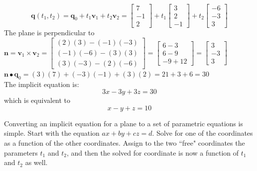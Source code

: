 \documentclass{article}
\begin{document}
\begin{itemize}
\[\mathbf{q}(t_1, t_2) = \mathbf{q}_0 + t_1\mathbf{v}_1 + t_2\mathbf{v}_2 = \begin{bmatrix} 7 \\ -1 \\ 2 \end{bmatrix} + t_1\begin{bmatrix} 3 \\ 2 \\ -1 \end{bmatrix} + t_2\begin{bmatrix} -6 \\ -3 \\ 3 \end{bmatrix}\]
The plane is perpendicular to \(\mathbf{n} = \mathbf{v}_1 \times \mathbf{v}_2 = \begin{bmatrix} (2)(3) - (-1)(-3) \\ (-1)(-6) - (3)(3) \\ (3)(-3) - (2)(-6) \end{bmatrix} = \begin{bmatrix} 6 - 3 \\ 6 - 9 \\ -9 + 12 \end{bmatrix} = \begin{bmatrix} 3 \\ -3 \\ 3 \end{bmatrix}\) \\
\(\mathbf{n} \bullet \mathbf{q}_0 = (3)(7) + (-3)(-1) + (3)(2) = 21 + 3 + 6 = 30\) \\
The implicit equation is:
\[3x - 3y + 3z = 30\]
which is equivalent to 
\[x - y + z = 10\]
\end{itemize}

\vspace{5mm}

Converting an implicit equation for a plane to a set of parametric equations is simple. Start with the equation \(a x + b y + c z = d\). Solve for one of the coordinates as a function of the other coordinates. Assign to the two ``free" coordinates the parameters \(t_1\) and \(t_2\), and then the solved for coordinate is now a function of \(t_1\) and \(t_2\) as well.
\end{document}
